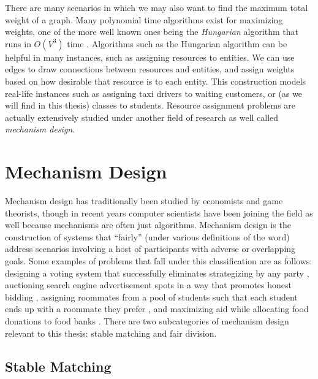There are many scenarios in which we may also want to find the maximum total
weight of a graph. Many polynomial time algorithms exist for maximizing weights,
one of the more well known ones being the \textit{Hungarian} algorithm that runs
in $O(V^3)$ time \cite{hungarian}. Algorithms such as the Hungarian algorithm can
be helpful in many instances, such as assigning resources to entities. We can use
edges to draw connections between resources and entities, and assign weights
based on how desirable that resource is to each entity. This construction models
real-life instances such as assigning taxi drivers to waiting customers, or (as we will
find in this thesis) classes to students. Resource assignment problems are
actually extensively studied under another field of research as well called
\textit{mechanism design}.


\section{Mechanism Design}

Mechanism design has traditionally been studied by economists and game
theorists, though in recent years computer scientists have been joining
the field as well because mechanisms are often just algorithms. Mechanism design is the
construction of systems that “fairly” (under various definitions of the word)
address scenarios involving a host of participants with adverse or overlapping
goals. Some examples of problems that fall under this classification are as
follows: designing a voting system that successfully eliminates strategizing by
any party \cite{voting}, auctioning search engine advertisement spots in a way
that promotes honest bidding \cite{auctions}, assigning roommates from a pool of
students such that each student ends up with a roommate they prefer
\cite{irving}, and maximizing aid while allocating food donations to food banks
\cite{foodbank}. There are two subcategories of mechanism design relevant to this
thesis: stable matching and fair division.

\subsection{Stable Matching}

